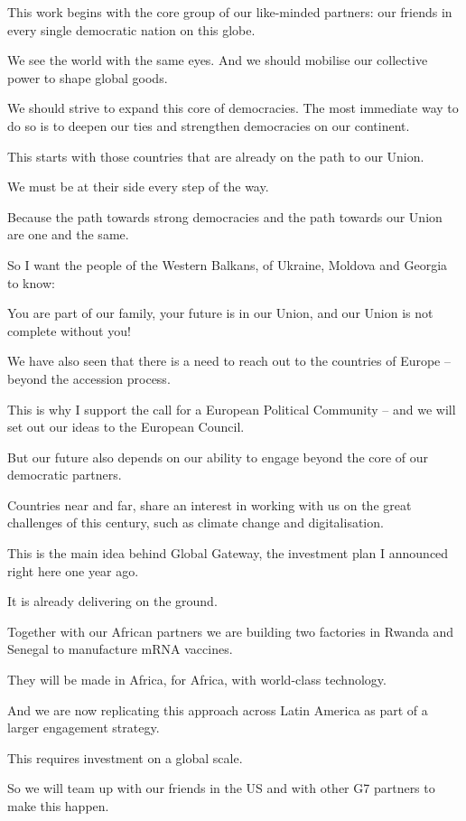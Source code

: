\documentclass[a4paper,11pt]{article}
\begin{document}
This work begins with the core group of our like-minded partners: our friends in every single democratic nation on this globe.

We see the world with the same eyes. And we should mobilise our collective power to shape global goods.

We should strive to expand this core of democracies. The most immediate way to do so is to deepen our ties and strengthen democracies on our continent.

This starts with those countries that are already on the path to our Union.

We must be at their side every step of the way.

Because the path towards strong democracies and the path towards our Union are one and the same.

So I want the people of the Western Balkans, of Ukraine, Moldova and Georgia to know:

You are part of our family, your future is in our Union, and our Union is not complete without you!

We have also seen that there is a need to reach out to the countries of Europe – beyond the accession process.

This is why I support the call for a European Political Community – and we will set out our ideas to the European Council.

But our future also depends on our ability to engage beyond the core of our democratic partners.

Countries near and far, share an interest in working with us on the great challenges of this century, such as climate change and digitalisation.

This is the main idea behind Global Gateway, the investment plan I announced right here one year ago.

It is already delivering on the ground.

Together with our African partners we are building two factories in Rwanda and Senegal to manufacture mRNA vaccines.

They will be made in Africa, for Africa, with world-class technology.

And we are now replicating this approach across Latin America as part of a larger engagement strategy.

This requires investment on a global scale.

So we will team up with our friends in the US and with other G7 partners to make this happen.
\end{document}
